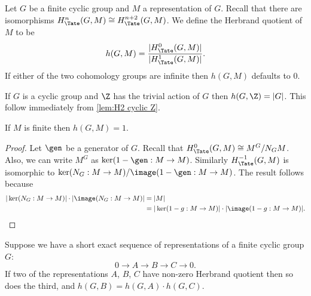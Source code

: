 \begin{definition}
  \label{def:herbrand quotient}
  \leanok
	Let $G$ be a finite cyclic group and $M$ a representation of $G$.
	Recall that there are isomorphisms $H^n_{\Tate}(G,M) \cong H^{n+2}_{\Tate}(G,M)$.
	We define the Herbrand quotient of $M$ to be
	\[
		h(G,M) = \frac{|H^0_{\Tate}(G,M)|}{|H^1_{\Tate}(G,M)|}.
	\]
	If either of the two cohomology groups are infinite then $h(G,M)$ defaults to $0$.
\end{definition}

\begin{example}
  \label{eg:herbrand Z}
  \leanok
	If $G$ is a cyclic group and $\Z$ has the trivial action of $G$ then $h(G,\Z) = |G|$.
	This follow immediately from \ref{lem:H2 cyclic Z}.
\end{example}


\begin{lemma}
  \label{lem:herbrand finite}
  \leanok
	If $M$ is finite then $h(G,M)=1$.
\end{lemma}

\begin{proof}
  \leanok
	Let $\gen$ be a generator of $G$.
	Recall that $H^0_{\Tate}(G,M) \cong M^G / N_GM$.
	Also, we can write $M^G$ as $\ker(1-\gen : M \to M)$.
	Similarly $H^{-1}_{\Tate}(G,M)$ is isomorphic to $\ker (N_G : M \to M) / \image (1-\gen : M \to M)$.
	The result follows because
	\begin{align*}
		|\ker(N_G : M \to M)| \cdot |\image(N_G : M \to M)|
		&=|M|\\
		&=|\ker(1-g : M \to M)| \cdot |\image(1-g : M \to M)|.
	\end{align*}
\end{proof}

\begin{lemma}
  \label{lem:herbrand ses}
  \leanok
	Suppose we have a short exact sequence of representations of a finite cyclic group $G$:
	\[
		0 \to A \to B \to C \to 0.
	\]
	If two of the representations $A$, $B$, $C$ have non-zero Herbrand quotient then so
	does the third, and $h(G,B) = h(G,A) \cdot h(G,C)$.
\end{lemma}

